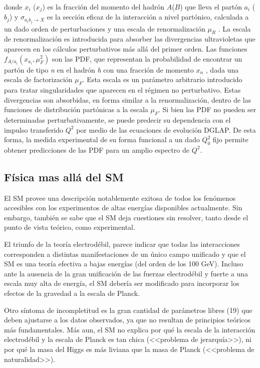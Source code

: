 donde $x_{i}$ ($x_{j}$) es la fracción del momento del hadrón $A$($B$) que lleva el partón $a_{i}$ ($b_{j}$) y $\sigma_{a_{i}b_{j}\rightarrow X}$ es la sección eficaz de la interacción a nivel partónico, calculada a un dado orden de perturbaciones y una escala de renormalización $\mu_R$ . La escala de renormalización es introducida para absorber las divergencias ultravioletas que aparecen en los cálculos perturbativos más allá del primer orden. Las funciones $f_{A/a_{i}}(x_{a_{i}},\mu_{F}^{2})$ son las PDF, que representan la probabilidad de encontrar un partón de tipo \textit{n} en el hadrón \textit{h} con una fracción de momento $x_{n}$ , dada una escala de factorización $\mu_{F}$. Esta escala es un parámetro arbitrario introducido para tratar singularidades que aparecen en el régimen no perturbativo. Estas divergencias son absorbidas, en forma similar a la renormalización, dentro de las funciones de distribución partónicas a la escala $\mu_{F}$. Si bien las PDF no pueden ser determinadas perturbativamente, se puede predecir su dependencia con el impulso transferido $Q^{2}$ por medio de las ecuaciones de evolución DGLAP. De esta forma, la medida experimental de su forma funcional a un dado $Q^{2}_{0}$ fijo permite obtener predicciones de las PDF para un amplio espectro de $Q^{2}$. 




\subsection{Física mas allá del SM}

El SM provee una descripción notablemente exitosa de todos los fenómenos accesibles con los experimentos de altas energías disponibles actualmente. Sin embargo, también se sabe que el SM deja cuestiones sin resolver, tanto desde el punto de vista teórico, como experimental.

El triunfo de la teoría electrodébil, parece indicar que todas las interacciones corresponden a distintas manifestaciones de un único campo unificado y que el SM es una teoría efectiva a bajas energías (del orden de los 100 GeV).  Incluso ante la ausencia de la gran unificación de las fuerzas electrodébil y fuerte a una escala muy alta de energía, el SM debería ser modificado para incorporar los efectos de la gravedad a la escala de Planck.

Otro síntoma de incompletitud es la gran cantidad de parámetros libres (19) que deben ajustarse a los datos observados, ya que no resultan de principios teóricos más fundamentales. Más aun, el SM no explica por qué la escala de la interacción electrodébil y la escala de Planck es tan chica (<<problema de jerarquía>>), ni por qué la masa del Higgs es más liviana que la masa de Planck (<<problema de naturalidad>>).


